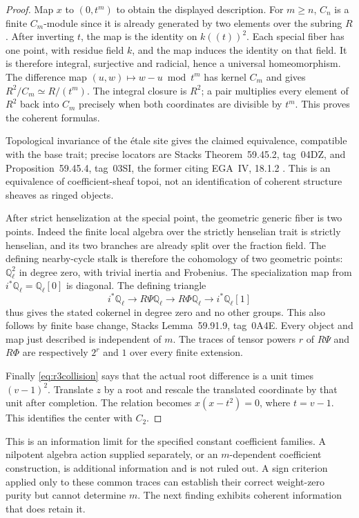 \documentclass[11pt,a4paper]{article}
\newcommand{\Q}{\mathbb Q}\newcommand{\Z}{\mathbb Z}\newcommand{\C}{\mathbb C}\newcommand{\N}{\mathbb N}\newcommand{\F}{\mathbb F}
\theoremstyle{named}\newtheorem{finding}{Finding}[section]
\theoremstyle{definition}\newtheorem{definition}[finding]{Definition}
\theoremstyle{remark}\newtheorem{remark}[finding]{Remark}
\begin{document}
\begin{proof}
Map $x$ to $(0,t^m)$ to obtain the displayed description. For $m\ge n$,
$C_n$ is a finite $C_m$-module since it is already generated by two
elements over the subring $R$. After inverting $t$, the map is the
identity on $k((t))^2$. Each special fiber has one point, with residue
field $k$, and the map induces the identity on that field. It is
therefore integral, surjective and radicial, hence a universal
homeomorphism. The difference map
$(u,w)\mapsto w-u\bmod t^m$ has kernel $C_m$ and gives
$R^2/C_m\simeq R/(t^m)$. The integral closure is $R^2$; a pair multiplies
every element of $R^2$ back into $C_m$ precisely when both coordinates
are divisible by $t^m$. This proves the coherent formulas.

Topological invariance of the \'etale site gives the claimed equivalence,
compatible with the base trait; precise locators are Stacks
Theorem~59.45.2, tag~04DZ, and Proposition~59.45.4, tag~03SI,
the former citing EGA~IV, 18.1.2 \cite{StacksNil}.
This is an equivalence of coefficient-sheaf topoi, not an identification
of coherent structure sheaves as ringed objects.

After strict henselization at the special point, the geometric generic
fiber is two points. Indeed the finite local algebra over the strictly
henselian trait is strictly henselian, and its two branches are already
split over the fraction field. The defining nearby-cycle stalk is
therefore the cohomology of two geometric points: $\Q_\ell^2$ in degree
zero, with trivial inertia and Frobenius. The specialization map from
$i^*\Q_\ell=\Q_\ell[0]$ is diagonal. The defining triangle
\[
 i^*\Q_\ell\longrightarrow R\Psi\Q_\ell
 \longrightarrow R\Phi\Q_\ell\longrightarrow i^*\Q_\ell[1]
\]
thus gives the stated cokernel in degree zero and no other groups.
This also follows by finite base change, Stacks Lemma~59.91.9,
tag~0A4E. Every object and map just described is independent of $m$.
The traces of tensor powers $r$ of $R\Psi$ and $R\Phi$ are respectively
$2^r$ and $1$ over every finite extension.

Finally \eqref{eq:r3collision} says that the actual root difference is
a unit times $(v-1)^2$. Translate $z$ by a root and rescale the translated
coordinate by that unit after completion. The relation becomes
$x(x-t^2)=0$, where $t=v-1$. This identifies the center with $C_2$.
\end{proof}
This is an information limit for the specified constant coefficient
families. A nilpotent algebra action supplied separately, or an
$m$-dependent coefficient construction, is additional information and
is not ruled out. A sign criterion applied only to these common traces
can establish their correct weight-zero purity but cannot determine
$m$. The next finding exhibits coherent information that does retain it.
\end{document}
